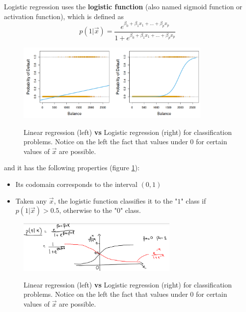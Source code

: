     Logistic regression uses the \textbf{logistic function} (also named sigmoid
    function or activation function), which is defined as
    $$p(1|\vec{x}) = \frac{e^{\beta_0 + \beta_1 x_1 + \dots + \beta_p x_p}}
                          {1+e^{\beta_0 + \beta_1 x_1 + \dots + \beta_p x_p}}$$                          
               
\begin{figure}[ht]
\caption{Linear regression (left) \textbf{vs} Logistic regression (right) for
classification problems. Notice on the left the fact that values under $0$ for
certain values of $\vec{x}$ are possible.}
\centering
\includegraphics[width=0.85\textwidth]{LogisticReg}
\label{LogvsReg}
\end{figure}           
                          
    and it has the following properties (figure \ref{LogvsReg}):
    \begin{itemize}
      \item Its codomain corresponds to the interval $(0,1)$
      \item Taken any $ \vec{x} $, the logistic function classifies it to the
      "$1$" class if $p(1|\vec{x}) > 0.5$, otherwise to the "$0$" class.
    \end{itemize}

    \begin{figure}[ht]
      \caption{Linear regression (left) \textbf{vs} Logistic regression (right)
      for classification problems. Notice on the left the fact that values under
      $0$ for certain values of $\vec{x}$ are possible.}
      \centering
      \includegraphics[width=0.7\textwidth]{logRegressionBernoulli}
      \label{classification: logRegExample}
      \end{figure}    


